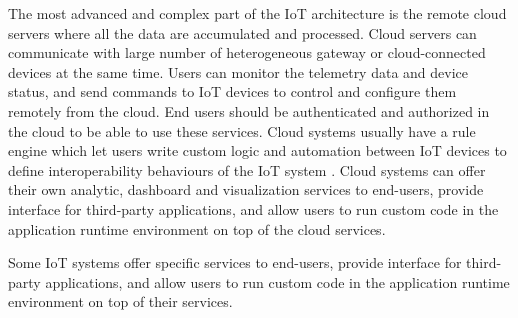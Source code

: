 The most advanced and complex part of the IoT architecture is the remote cloud servers \cite{stojkoska2017review}where all the data are accumulated and processed. Cloud servers can communicate with large number of heterogeneous gateway or cloud-connected devices at the same time. Users can monitor the telemetry data and device status, and send commands to IoT devices to control and configure them remotely from the cloud. End users should be authenticated and authorized in the cloud to be able to use these services. Cloud systems usually have a rule engine which let users write custom logic and automation between IoT devices to define interoperability behaviours of the IoT system \cite{securityUsenix2019}. Cloud systems can offer their own analytic, dashboard and visualization services to end-users, provide interface for third-party applications, and allow users to run custom code in the application runtime environment on top of the cloud services\cite{vcolakovic2018IoT}.

Some IoT systems offer specific services to end-users, provide interface for third-party applications, and allow users to run custom code in the application runtime environment on top of their services\cite{vcolakovic2018IoT}.






\endinput


